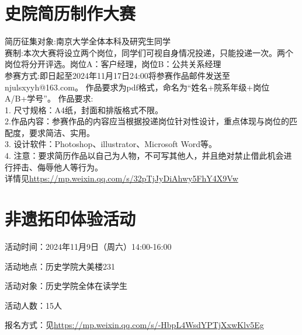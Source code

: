 \documentclass[letterpaper, 12pt]{article}
\begin{document}
\begin{multicols}{2}
\section{史院简历制作大赛}
简历征集对象:南京大学全体本科及研究生同学\\
赛制:本次大赛将设立两个岗位，同学们可视自身情况投递，只能投递一次。两个岗位将分开评选。岗位A：客户经理，岗位B：公共关系经理\\
参赛方式:即日起至2024年11月17日24:00将参赛作品邮件发送至njulsxyyh@163.com。
作品要求为pdf格式，命名为“姓名+院系年级+岗位A/B+学号”。
作品要求:\\
1. 尺寸规格：A4纸，封面和排版格式不限。\\
2.作品内容：参赛作品的内容应当根据投递岗位针对性设计，重点体现与岗位的匹配度，要求简洁、实用。\\
3. 设计软件：Photoshop、illustrator、Microsoft Word等。\\
4. 注意：要求简历作品以自己为人物，不可写其他人，并且绝对禁止借此机会进行抨击、侮辱他人等行为。\\
详情见\url{https://mp.weixin.qq.com/s/32pTjJyDiAhwy5FhY4X9Vw}
\section{非遗拓印体验活动}
活动时间：2024年11月9日（周六）14:00-16:00

活动地点：历史学院大美楼231

活动对象：历史学院全体在读学生

活动人数：15人

报名方式：见\url{https://mp.weixin.qq.com/s/-HbpL4WsdYPTjXxwKlv5Eg}

\end{multicols} 
\end{document}
